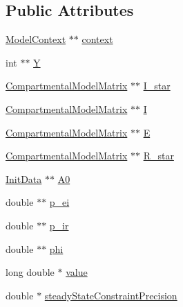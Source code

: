 \subsection*{Public Attributes}
\begin{DoxyCompactItemize}
\item 
\hyperlink{classSpatialSEIR_1_1ModelContext}{Model\-Context} $\ast$$\ast$ \hyperlink{classSpatialSEIR_1_1FC__I__Star__overdispersed_ad900ca243647ff1a0aad4cbddf09d526}{context}
\item 
int $\ast$$\ast$ \hyperlink{classSpatialSEIR_1_1FC__I__Star__overdispersed_ade65d87298fcc402c6ac460aef295180}{Y}
\item 
\hyperlink{classSpatialSEIR_1_1CompartmentalModelMatrix}{Compartmental\-Model\-Matrix} $\ast$$\ast$ \hyperlink{classSpatialSEIR_1_1FC__I__Star__overdispersed_ad4744526a8882ecbbd7aa2e5dbaea96c}{I\-\_\-star}
\item 
\hyperlink{classSpatialSEIR_1_1CompartmentalModelMatrix}{Compartmental\-Model\-Matrix} $\ast$$\ast$ \hyperlink{classSpatialSEIR_1_1FC__I__Star__overdispersed_acfa3e76171de9ada554843ce43bb353f}{I}
\item 
\hyperlink{classSpatialSEIR_1_1CompartmentalModelMatrix}{Compartmental\-Model\-Matrix} $\ast$$\ast$ \hyperlink{classSpatialSEIR_1_1FC__I__Star__overdispersed_af797f5c00660e0c3f96563ac8e25160e}{E}
\item 
\hyperlink{classSpatialSEIR_1_1CompartmentalModelMatrix}{Compartmental\-Model\-Matrix} $\ast$$\ast$ \hyperlink{classSpatialSEIR_1_1FC__I__Star__overdispersed_a4459a1e540b6980737d36c4e9425862b}{R\-\_\-star}
\item 
\hyperlink{classSpatialSEIR_1_1InitData}{Init\-Data} $\ast$$\ast$ \hyperlink{classSpatialSEIR_1_1FC__I__Star__overdispersed_a2076d3cbc52d91182d2e659fc7668101}{A0}
\item 
double $\ast$$\ast$ \hyperlink{classSpatialSEIR_1_1FC__I__Star__overdispersed_aa7235e850643e3f73cfe5e941add3999}{p\-\_\-ei}
\item 
double $\ast$$\ast$ \hyperlink{classSpatialSEIR_1_1FC__I__Star__overdispersed_a02722ae119baaed1d50795af36c78aa5}{p\-\_\-ir}
\item 
double $\ast$$\ast$ \hyperlink{classSpatialSEIR_1_1FC__I__Star__overdispersed_a128a90fee53566ef1e093b2227f87814}{phi}
\item 
long double $\ast$ \hyperlink{classSpatialSEIR_1_1FC__I__Star__overdispersed_abc747c69c47f8b6019e27c64c0ddeb8c}{value}
\item 
double $\ast$ \hyperlink{classSpatialSEIR_1_1FC__I__Star__overdispersed_a32ef601f1c6b7c0131261f1eb0214e6d}{steady\-State\-Constraint\-Precision}
\end{DoxyCompactItemize}



